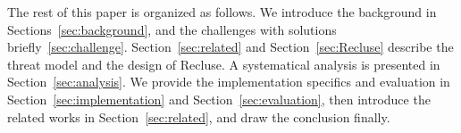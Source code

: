 The rest of this paper is organized as follows. We introduce the background in Sections~\ref{sec:background}, and the challenges with solutions briefly~\ref{sec:challenge}. Section~\ref{sec:related} and Section~\ref{sec:Recluse} describe the threat model and the design of Recluse. A systematical analysis is presented in Section~\ref{sec:analysis}. We provide the implementation specifics and evaluation in Section~\ref{sec:implementation} and Section~\ref{sec:evaluation}, then introduce the related works in Section~\ref{sec:related}, and draw the conclusion finally.




